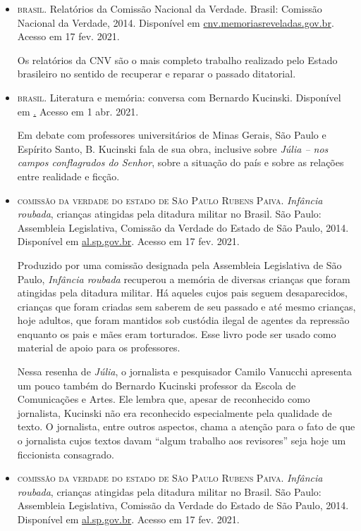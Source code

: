 \documentclass[12pt]{extarticle}
\begin{document}
\begin{itemize}


\item \textsc{brasil}. Relatórios da Comissão Nacional da Verdade. Brasil: Comissão
Nacional da Verdade, 2014. Disponível em
\href{http://cnv.memoriasreveladas.gov.br/}{{cnv.memoriasreveladas.gov.br}}.
Acesso em 17 fev. 2021.

Os relatórios da CNV são o mais completo trabalho realizado pelo Estado
brasileiro no sentido de recuperar e reparar o passado ditatorial.

\item \textsc{brasil}. Literatura e memória: conversa com Bernardo Kucinski. Disponível em
\href{youtu.be/6jqMK8vqYQM}.
Acesso em 1 abr. 2021.

Em debate com professores universitários de Minas Gerais, São Paulo e Espírito Santo, B. Kucinski fala de sua obra, inclusive sobre \emph{Júlia -- nos campos conflagrados do Senhor}, sobre a situação do país e sobre as relações entre realidade e ficção.

\item \textsc{comissão da verdade do estado de São Paulo Rubens Paiva.} \emph{Infância
roubada}, crianças atingidas pela ditadura militar no Brasil. São Paulo:
Assembleia Legislativa, Comissão da Verdade do Estado de São Paulo,
2014. Disponível em
\href{https://www.al.sp.gov.br/repositorio/bibliotecaDigital/20800_arquivo.pdf}{{al.sp.gov.br}}.
Acesso em 17 fev. 2021.

Produzido por uma comissão designada pela Assembleia Legislativa de São
Paulo, \emph{Infância roubada} recuperou a memória de diversas crianças
que foram atingidas pela ditadura militar. Há aqueles cujos pais seguem
desaparecidos, crianças que foram criadas sem saberem de seu passado e
até mesmo crianças, hoje adultos, que foram mantidos sob custódia ilegal
de agentes da repressão enquanto os pais e mães eram torturados. Esse
livro pode ser usado como material de apoio para os professores.

Nessa resenha de \emph{Júlia}, o jornalista e pesquisador Camilo
Vanucchi apresenta um pouco também do Bernardo Kucinski professor da
Escola de Comunicações e Artes. Ele lembra que, apesar de reconhecido
como jornalista, Kucinski não era reconhecido especialmente pela
qualidade de texto. O jornalista, entre outros aspectos, chama a atenção
para o fato de que o jornalista cujos textos davam ``algum trabalho aos
revisores'' seja hoje um ficcionista consagrado.


\item \textsc{comissão da verdade do estado de São Paulo Rubens Paiva.} \emph{Infância
roubada}, crianças atingidas pela ditadura militar no Brasil. São Paulo:
Assembleia Legislativa, Comissão da Verdade do Estado de São Paulo,
2014. Disponível em
\href{https://www.al.sp.gov.br/repositorio/bibliotecaDigital/20800_arquivo.pdf}{{al.sp.gov.br}}.
Acesso em 17 fev. 2021.


\end{itemize}
\end{document}
